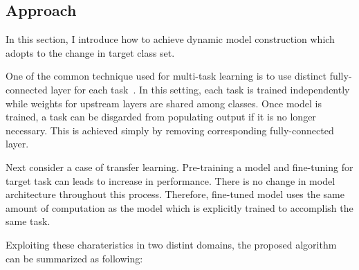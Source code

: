 \documentclass{article}
\begin{document}

\subsection{Approach}

In this section, I introduce how to achieve dynamic model construction which adopts to the change in target class set.

One of the common technique used for multi-task learning is to use distinct fully-connected layer for each task~\cite{huang2016mtnet, girshick2015fast, long2017learning}. In this setting, each task is trained independently while weights for upstream layers are shared among classes. Once model is trained, a task can be disgarded from populating output if it is no longer necessary. This is achieved simply by removing corresponding fully-connected layer.

Next consider a case of transfer learning. Pre-training a model and fine-tuning for target task can leads to increase in performance. There is no change in model architecture throughout this process. Therefore, fine-tuned model uses the same amount of computation as the model which is explicitly trained to accomplish the same task.

Exploiting these charateristics in two distint domains, the proposed algorithm can be summarized as following:
\end{document}
